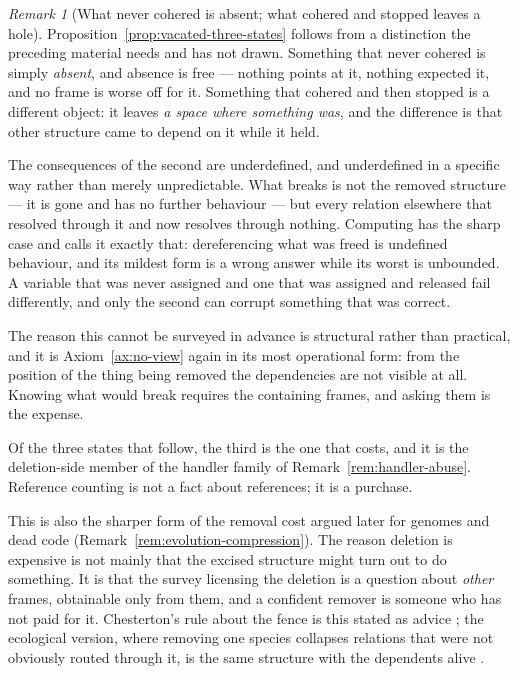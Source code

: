 \documentclass[11pt,a4paper]{article}
\theoremstyle{remark}\newtheorem{remark}[definition]{Remark}
\begin{document}
\begin{remark}[What never cohered is absent; what cohered and stopped leaves a hole]\label{rem:vacated}
Proposition~\ref{prop:vacated-three-states} follows from a distinction the preceding material needs
and has not drawn. Something that never cohered is simply
\emph{absent}, and absence is free --- nothing points at it, nothing expected it, and no frame is worse
off for it. Something that cohered and then stopped is a different object: it leaves \emph{a space
where something was}, and the difference is that other structure came to depend on it while it held.

The consequences of the second are underdefined, and underdefined in a specific way rather than merely
unpredictable. What breaks is not the removed structure --- it is gone and has no further behaviour ---
but every relation elsewhere that resolved through it and now resolves through nothing. Computing has
the sharp case and calls it exactly that: dereferencing what was freed is undefined behaviour, and its
mildest form is a wrong answer while its worst is unbounded. A variable that was never assigned and one
that was assigned and released fail differently, and only the second can corrupt something that was
correct.

The reason this cannot be surveyed in advance is structural rather than practical, and it is
Axiom~\ref{ax:no-view} again in its most operational form: from the position of the thing being
removed the dependencies are not visible at all. Knowing what would break requires the
containing frames, and asking them is the expense.

Of the three states that follow, the third is the one that costs, and it is the deletion-side member
of the handler family of Remark~\ref{rem:handler-abuse}. Reference counting is not a fact about
references; it is a purchase.

This is also the sharper form of the removal cost argued later for genomes and dead code
(Remark~\ref{rem:evolution-compression}). The reason deletion is expensive is not mainly that the
excised structure might turn out to do something. It is that the survey licensing the deletion is a
question about \emph{other} frames, obtainable only from them, and a confident remover is someone who
has not paid for it. Chesterton's rule about the fence is this stated as advice \citep{chesterton1929};
the ecological version, where removing one species collapses relations that were not obviously routed
through it, is the same structure with the dependents alive \citep{paine1969}.
\end{remark}
\end{document}
